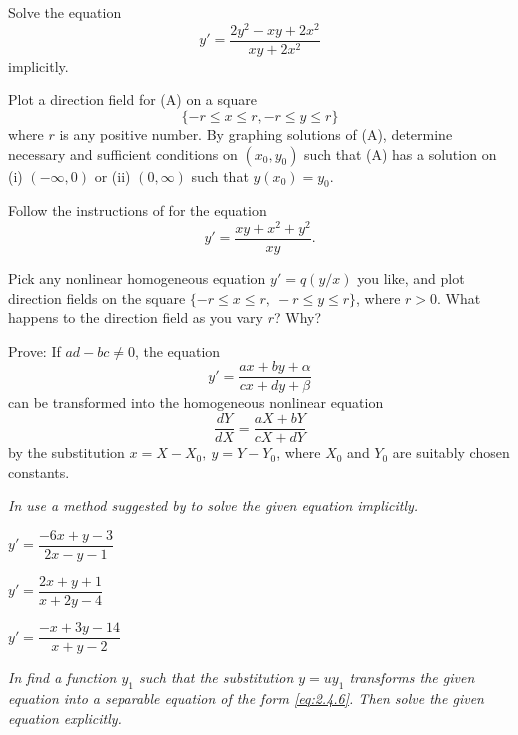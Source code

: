 \begin{exerciselist}
\item\label{exer:2.4.37}\Lex
\begin{alist}
\item %
Solve the equation
\[
y'=\frac{2y^2-xy+2x^2 }{xy+2x^2}\tag{A}
\]
implicitly.
\item %
Plot a direction field for (A) on a square
\[
\{-r\le x\le r,-r\le y\le r\}
\]
where $r$ is any positive number. By graphing solutions of (A),
determine necessary and sufficient conditions on $(x_0,y_0)$ such that
(A) has a solution on (i) $(-\infty,0)$ or (ii) $(0,\infty)$ such that
$y(x_0)=y_0$.
\end{alist}

\item\label{exer:2.4.38}\Lex
Follow the instructions of  for the equation
\[
y'=\frac{xy+x^2+y^2 }{xy}.
\]

\item\label{exer:2.4.39}\Lex
Pick any  nonlinear homogeneous equation $y'=q(y/x)$  you like, and
plot  direction fields on the square $\{-r\le x\le r,\ -r\le y\le
r\}$,
where $r>0$. What happens to the direction field as you vary $r$?
Why?

\item\label{exer:2.4.40}Prove:  If $ad-bc\ne 0$, the equation
\[
y'=\frac{ax+by+\alpha }{cx+dy+\beta}
\]
can be transformed into the homogeneous nonlinear equation
\[
\frac{dY }{dX}=\frac{aX+bY }{cX+dY}
\]
by the substitution $x=X-X_0,\  y=Y-Y_0$,
where $X_0$ and $Y_0$ are suitably chosen constants.
\end{exerciselist}
%
\textsl{In  use a
method suggested by  to solve the
given equation implicitly.}

\begin{exerciselistTwoColumn}
\item\label{exer:2.4.41}$y'=\dfrac{-6x+y-3 }{2x-y-1}$
\item\label{exer:2.4.42}$y'=\dfrac{2x+y+1 }{x+2y-4}$
\item\label{exer:2.4.43}$y'=\dfrac{-x+3y-14 }{x+y-2}$
\end{exerciselistTwoColumn}
%
\textsl{In  find
a function $y_1$ such that the substitution $y=uy_1$ transforms
the given equation  into a separable
equation of the form \eqref{eq:2.4.6}. Then solve the given equation
explicitly.}

